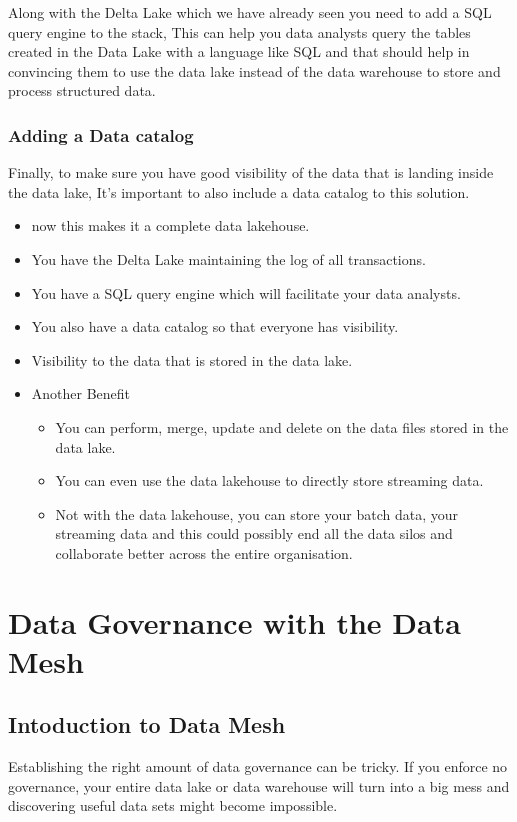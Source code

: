 \documentclass[a4paper, 11pt]{book}
\begin{document}
    Along with the Delta Lake which we have already seen you need to add a SQL query engine to the stack,
    This can help you data analysts query the tables created in the Data Lake with a language like SQL and that should help in convincing them to use the data lake instead of the data warehouse to store and process structured data.

    \subsubsection{Adding a Data catalog}
    Finally, to make sure you have good visibility of the data that is landing inside the data lake, It's important to also include a data catalog to this solution.
    \begin{itemize}
        \item now this makes it a complete data lakehouse.
        \item You have the Delta Lake maintaining the log of all transactions.
        \item You have a SQL query engine which will facilitate your data analysts.
        \item You also have a data catalog so that everyone has visibility.
        \item Visibility to the data that is stored in the data lake.
        \item Another Benefit \begin{itemize}
                                  \item You can perform, merge, update and delete on the data files stored in the data lake.
                                  \item You can even use the data lakehouse to directly store streaming data.
                                  \item Not with the data lakehouse, you can store your batch data, your streaming data and this could possibly end all the data silos and collaborate better across the entire organisation.
        \end{itemize}
    \end{itemize}


    \section{Data Governance with the Data Mesh}


    \subsection{Intoduction to Data Mesh}
    Establishing the right amount of data governance can be tricky.
    If you enforce no governance, your entire data lake or data warehouse will turn into a big mess and discovering useful data sets might become impossible.
\end{document}
